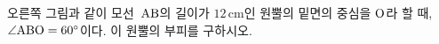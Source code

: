 \noindent\begin{minipage}[t]{0.58\linewidth}\vspace{0pt}\raggedright 오른쪽 그림과 같이 모선~$\mathrm{AB}$의 길이가 $12\,\mathrm{cm}$인 원뿔의 밑면의 중심을 $\mathrm{O}$라 할 때, $\angle\mathrm{ABO}=60^\circ$이다. 이 원뿔의 부피를 구하시오.\end{minipage}\hfill\begin{minipage}[t]{0.4\linewidth}\vspace{0pt}\centering \resizebox{\ifdim\width>\linewidth\linewidth\else\width\fi}{!}{}\end{minipage}\par
